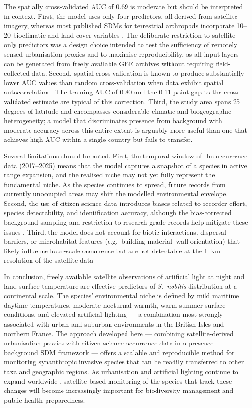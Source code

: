 \documentclass[11pt, a4paper, twocolumn]{article}
\begin{document}
The spatially cross-validated AUC of 0.69 is moderate but should be interpreted in context. First, the model uses only four predictors, all derived from satellite imagery, whereas most published SDMs for terrestrial arthropods incorporate 10--20 bioclimatic and land-cover variables \citep{Elith2006}. The deliberate restriction to satellite-only predictors was a design choice intended to test the sufficiency of remotely sensed urbanisation proxies and to maximise reproducibility, as all input layers can be generated from freely available GEE archives without requiring field-collected data. Second, spatial cross-validation is known to produce substantially lower AUC values than random cross-validation when data exhibit spatial autocorrelation \citep{Roberts2017, Valavi2019}. The training AUC of 0.80 and the 0.11-point gap to the cross-validated estimate are typical of this correction. Third, the study area spans 25 degrees of latitude and encompasses considerable climatic and biogeographic heterogeneity; a model that discriminates presence from background with moderate accuracy across this entire extent is arguably more useful than one that achieves high AUC within a single country but fails to transfer.

Several limitations should be noted. First, the temporal window of the occurrence data (2017--2025) means that the model captures a snapshot of a species in active range expansion, and the realised niche may not yet fully represent the fundamental niche. As the species continues to spread, future records from currently unoccupied areas may shift the modelled environmental envelope. Second, the use of citizen-science data introduces biases related to recorder effort, species detectability, and identification accuracy, although the bias-corrected background sampling and restriction to research-grade records help mitigate these issues \citep{Beck2014}. Third, the model does not account for biotic interactions, dispersal barriers, or microhabitat features (e.g.\ building material, wall orientation) that likely influence local-scale occurrence but are not detectable at the 1~km resolution of the satellite data.

In conclusion, freely available satellite observations of artificial light at night and land surface temperature are effective predictors of \textit{S.~nobilis} distribution at a continental scale. The species' environmental niche is defined by mild maritime daytime temperatures, moderate nocturnal warmth, warm summer surface conditions, and elevated artificial lighting --- a combination most strongly associated with urban and suburban environments in the British Isles and northern France. The approach developed here --- combining satellite-derived urbanisation proxies with citizen-science occurrence data in a presence-background SDM framework --- offers a scalable and reproducible method for monitoring synanthropic invasive species that can be readily transferred to other taxa and geographic regions. As urbanisation and artificial lighting continue to expand worldwide \citep{Kyba2017}, satellite-based monitoring of the species that track these changes will become increasingly important for biodiversity management and public health preparedness.
\end{document}
